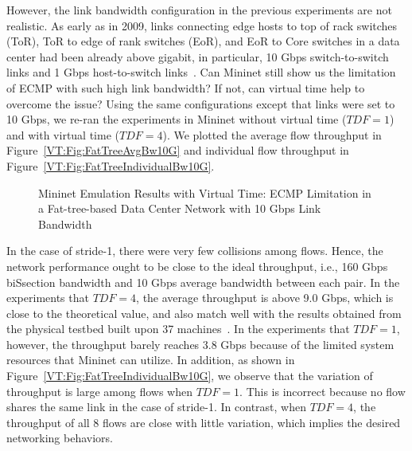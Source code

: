However, the link bandwidth configuration in the previous experiments are not realistic.
As early as in 2009, links connecting edge hosts to top of rack switches (ToR), ToR to edge of rank switches (EoR),
and EoR to Core switches in a data center had been already above gigabit,
in particular, 10 Gbps switch-to-switch links and 1 Gbps host-to-switch links~\cite{ScaleEffDCN}.
Can Mininet still show us the limitation of ECMP with such high link bandwidth?
If not, can virtual time help to overcome the issue?
Using the same configurations except that links were set to 10 Gbps,
we re-ran the experiments in Mininet without virtual time ($TDF=1$) and with virtual time ($TDF = 4$).
We plotted the average flow throughput in Figure~\ref{VT:Fig:FatTreeAvgBw10G} and
individual flow throughput in Figure~\ref{VT:Fig:FatTreeIndividualBw10G}.

\begin{figure}[ht]
    \centering
    \caption[Emulate ECMP with High Link Bandwdith]{Mininet Emulation Results with Virtual Time: ECMP Limitation in a Fat-tree-based Data Center Network with 10 Gbps Link Bandwidth}
\end{figure}

In the case of stride-1, there were very few collisions among flows.
Hence, the network performance ought to be close to the ideal throughput, i.e., 160 Gbps biSsection bandwidth and 10 Gbps average bandwidth between each pair.
In the experiments that $TDF=4$, the average throughput is above 9.0 Gbps, which is close to the theoretical value,
and also match well with the results obtained from the physical testbed built upon 37 machines~\cite{Hedera}.
In the experiments that $TDF=1$, however, the throughput barely reaches 3.8 Gbps because of the limited system resources that Mininet can utilize.
In addition, as shown in Figure~\ref{VT:Fig:FatTreeIndividualBw10G},
we observe that the variation of throughput is large among flows when $TDF=1$.
This is incorrect because no flow shares the same link in the case of stride-1.
In contrast, when $TDF = 4$, the throughput of all 8 flows are close with little variation, which implies the desired networking behaviors. 


